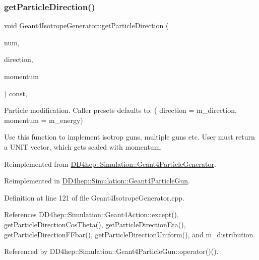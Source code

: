 \subsubsection{\texorpdfstring{get\+Particle\+Direction()}{getParticleDirection()}}
{\footnotesize\ttfamily void Geant4\+Isotrope\+Generator\+::get\+Particle\+Direction (\begin{DoxyParamCaption}\item[{int}]{num,  }\item[{R\+O\+O\+T\+::\+Math\+::\+X\+Y\+Z\+Vector \&}]{direction,  }\item[{double \&}]{momentum }\end{DoxyParamCaption}) const\hspace{0.3cm}{\ttfamily [protected]}, {\ttfamily [virtual]}}



Particle modification. Caller presets defaults to\+: ( direction = m\+\_\+direction, momentum = m\+\_\+energy) 

Use this function to implement isotrop guns, multiple guns etc. User must return a U\+N\+IT vector, which gets scaled with momentum. 

Reimplemented from \hyperlink{class_d_d4hep_1_1_simulation_1_1_geant4_particle_generator_a877449e84d0d8ccf2ca52584db3b0fab}{D\+D4hep\+::\+Simulation\+::\+Geant4\+Particle\+Generator}.



Reimplemented in \hyperlink{class_d_d4hep_1_1_simulation_1_1_geant4_particle_gun_a442d44c1db6bfe109a1c129859900e55}{D\+D4hep\+::\+Simulation\+::\+Geant4\+Particle\+Gun}.



Definition at line 121 of file Geant4\+Isotrope\+Generator.\+cpp.



References D\+D4hep\+::\+Simulation\+::\+Geant4\+Action\+::except(), get\+Particle\+Direction\+Cos\+Theta(), get\+Particle\+Direction\+Eta(), get\+Particle\+Direction\+F\+Fbar(), get\+Particle\+Direction\+Uniform(), and m\+\_\+distribution.



Referenced by D\+D4hep\+::\+Simulation\+::\+Geant4\+Particle\+Gun\+::operator()().

\hypertarget{class_d_d4hep_1_1_simulation_1_1_geant4_isotrope_generator_acca659200388e8bf4e5acf7a24fcb332}{}\label{class_d_d4hep_1_1_simulation_1_1_geant4_isotrope_generator_acca659200388e8bf4e5acf7a24fcb332} 
